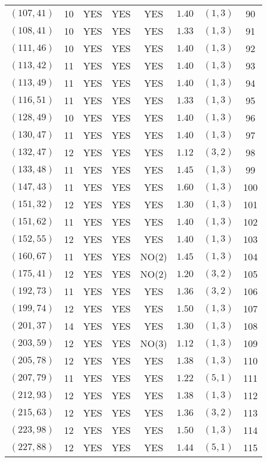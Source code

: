 \begin{longtable}{|c|c|c|c|c|c|c|c|}
$(107,41)$ & 10 & YES & YES & YES & $1.40$ & $(1,3)$ & 90\\
$(108,41)$ & 10 & YES & YES & YES & $1.33$ & $(1,3)$ & 91\\
$(111,46)$ & 10 & YES & YES & YES & $1.40$ & $(1,3)$ & 92\\
$(113,42)$ & 11 & YES & YES & YES & $1.40$ & $(1,3)$ & 93\\
$(113,49)$ & 11 & YES & YES & YES & $1.40$ & $(1,3)$ & 94\\
$(116,51)$ & 11 & YES & YES & YES & $1.33$ & $(1,3)$ & 95\\
$(128,49)$ & 10 & YES & YES & YES & $1.40$ & $(1,3)$ & 96\\
$(130,47)$ & 11 & YES & YES & YES & $1.40$ & $(1,3)$ & 97\\
$(132,47)$ & 12 & YES & YES & YES & $1.12$ & $(3,2)$ & 98\\
$(133,48)$ & 11 & YES & YES & YES & $1.45$ & $(1,3)$ & 99\\
$(147,43)$ & 11 & YES & YES & YES & $1.60$ & $(1,3)$ & 100\\
$(151,32)$ & 12 & YES & YES & YES & $1.30$ & $(1,3)$ & 101\\
$(151,62)$ & 11 & YES & YES & YES & $1.40$ & $(1,3)$ & 102\\
$(152,55)$ & 12 & YES & YES & YES & $1.40$ & $(1,3)$ & 103\\
$(160,67)$ & 11 & YES & YES & NO(2) & $1.45$ & $(1,3)$ & 104\\
$(175,41)$ & 12 & YES & YES & NO(2) & $1.20$ & $(3,2)$ & 105\\
$(192,73)$ & 11 & YES & YES & YES & $1.36$ & $(3,2)$ & 106\\
$(199,74)$ & 12 & YES & YES & YES & $1.50$ & $(1,3)$ & 107\\
$(201,37)$ & 14 & YES & YES & YES & $1.30$ & $(1,3)$ & 108\\
$(203,59)$ & 12 & YES & YES & NO(3) & $1.12$ & $(1,3)$ & 109\\
$(205,78)$ & 12 & YES & YES & YES & $1.38$ & $(1,3)$ & 110\\
$(207,79)$ & 11 & YES & YES & YES & $1.22$ & $(5,1)$ & 111\\
$(212,93)$ & 12 & YES & YES & YES & $1.38$ & $(1,3)$ & 112\\
$(215,63)$ & 12 & YES & YES & YES & $1.36$ & $(3,2)$ & 113\\
$(223,98)$ & 12 & YES & YES & YES & $1.50$ & $(1,3)$ & 114\\
$(227,88)$ & 12 & YES & YES & YES & $1.44$ & $(5,1)$ & 115\\

\end{longtable}

